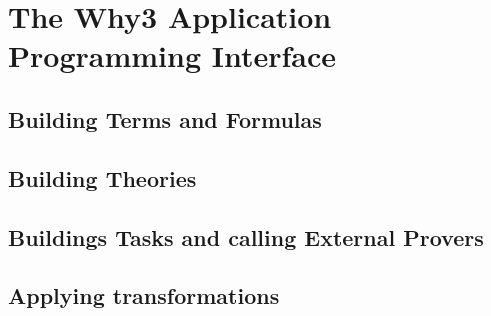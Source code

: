 \chapter{The Why3 Application Programming Interface}
\label{chap:api}

\section{Building Terms and Formulas}

\section{Building Theories}

\section{Buildings Tasks and calling External Provers}

\section{Applying transformations}

